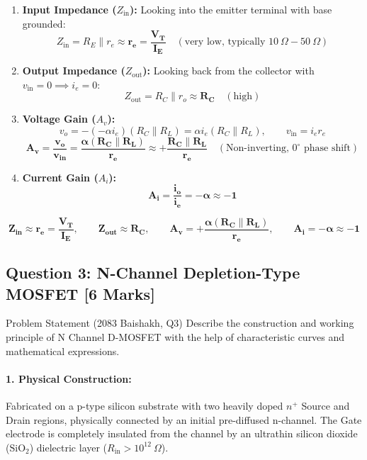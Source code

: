\documentclass[11pt,a4paper,oneside]{book}
\begin{document}
\begin{enumerate}[leftmargin=1.5em]
  \item \textbf{Input Impedance ($Z_{\text{in}}$):}
  Looking into the emitter terminal with base grounded:
  \[
  Z_{\text{in}} = R_E \parallel r_e \approx \mathbf{r_e = \frac{V_T}{I_E}} \quad (\text{very low, typically } 10\ \Omega - 50\ \Omega)
  \]
  \item \textbf{Output Impedance ($Z_{\text{out}}$):}
  Looking back from the collector with $v_{\text{in}} = 0 \implies i_e = 0$:
  \[
  Z_{\text{out}} = R_C \parallel r_o \approx \mathbf{R_C} \quad (\text{high})
  \]
  \item \textbf{Voltage Gain ($A_v$):}
  \[
  v_o = -(-\alpha i_e)(R_C \parallel R_L) = \alpha i_e (R_C \parallel R_L), \qquad v_{\text{in}} = i_e r_e
  \]
  \[
  \mathbf{A_v = \frac{v_o}{v_{\text{in}}} = \frac{\alpha (R_C \parallel R_L)}{r_e} \approx +\frac{R_C \parallel R_L}{r_e}} \quad (\text{Non-inverting, } 0^\circ \text{ phase shift})
  \]
  \item \textbf{Current Gain ($A_i$):}
  \[
  \mathbf{A_i = \frac{i_o}{i_e} = -\alpha \approx -1}
  \]
\end{enumerate}

\begin{answerbox}
$$\mathbf{Z_{\text{in}} \approx r_e = \frac{V_T}{I_E}, \qquad Z_{\text{out}} \approx R_C, \qquad A_v = +\frac{\alpha(R_C \parallel R_L)}{r_e}, \qquad A_i = -\alpha \approx -1}$$
\end{answerbox}

\vspace{0.6cm}

\subsection{Question 3: N-Channel Depletion-Type MOSFET [6 Marks]}
\begin{questionbox}{Problem Statement (2083 Baishakh, Q3)}
Describe the construction and working principle of N Channel D-MOSFET with the help of characteristic curves and mathematical expressions.
\end{questionbox}

\paragraph{1. Physical Construction:}
Fabricated on a p-type silicon substrate with two heavily doped $n^+$ Source and Drain regions, physically connected by an initial pre-diffused n-channel. The Gate electrode is completely insulated from the channel by an ultrathin silicon dioxide ($\text{SiO}_2$) dielectric layer ($R_{\text{in}} > 10^{12}\ \Omega$).
\end{document}
